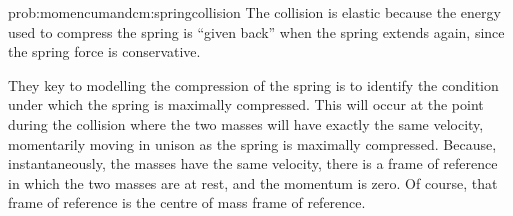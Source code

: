 \begin{solution}{prob:momencumandcm:springcollision}\label{soln:momentumandcm:springcollision}
The collision is elastic because the energy used to compress the spring is ``given back'' when the spring extends again, since the spring force is conservative. 

They key to modelling the compression of the spring is to identify the condition under which the spring is maximally compressed. This will occur at the point during the collision where the two masses will have exactly the same velocity, momentarily moving in unison as the spring is maximally compressed. Because, instantaneously, the masses have the same velocity, there is a frame of reference in which the two masses are at rest, and the momentum is zero. Of course, that frame of reference is the centre of mass frame of reference. 


\end{solution}
